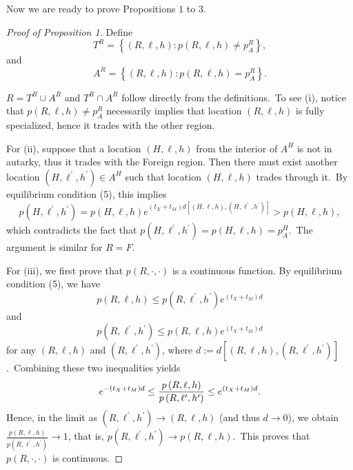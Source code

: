 \documentclass[12pt]{article}
\begin{document}
Now we are ready to prove Propositions $1$ to $3$.

\begin{proof}[Proof of Proposition 1]
Define%
\begin{equation*}
T^{R}=\left \{ \left( R,\ell ,h\right) :p\left( R,\ell ,h\right) \neq
p_{A}^{R}\right \} ,
\end{equation*}%
and%
\begin{equation*}
A^{R}=\left \{ \left( R,\ell ,h\right) :p\left( R,\ell ,h\right)
=p_{A}^{R}\right \} .
\end{equation*}

$R=T^{R}\cup A^{R}$ and $T^{R}\cap A^{R}$ follow directly from the
definitions.\ To see (i), notice that $p\left( R,\ell ,h\right) \neq
p_{A}^{R}$ necessarily implies that location $\left( R,\ell ,h\right) $ is
fully specialized, hence it trades with the other region.

For (ii), suppose that a location $\left( H,\ell ,h\right) $ from the
interior of $A^{H}$ is not in autarky, thus it trades with the Foreign
region. Then there must exist another location $\left( H,\ell ^{\prime
},h^{\prime }\right) \in A^{H}$ such that location $\left( H,\ell ,h\right) $
trades through it.\ By equilibrium condition (5), this implies%
\begin{equation*}
p\left( H,\ell ^{\prime },h^{\prime }\right) =p\left( H,\ell ,h\right)
e^{\left( t_{X}+t_{M}\right) d\left[ \left( H,\ell ,h\right) ,\left( H,\ell
^{\prime },h^{\prime }\right) \right] }>p\left( H,\ell ,h\right) ,
\end{equation*}%
which contradicts the fact that $p\left( H,\ell ^{\prime },h^{\prime
}\right) =p\left( H,\ell ,h\right) =p_{A}^{H}$.\ The argument is similar for 
$R=F$.

For (iii), we first prove that $p\left( R,\cdot ,\cdot \right) $ is a
continuous function. By equilibrium condition (5), we have%
\begin{equation*}
p\left( R,\ell ,h\right) \leq p\left( R,\ell ^{\prime },h^{\prime }\right)
e^{\left( t_{X}+t_{M}\right) d}
\end{equation*}%
and%
\begin{equation*}
p\left( R,\ell ^{\prime },h^{\prime }\right) \leq p\left( R,\ell ,h\right)
e^{\left( t_{X}+t_{M}\right) d}
\end{equation*}%
for any $\left( R,\ell ,h\right) $ and $\left( R,\ell ^{\prime },h^{\prime
}\right) $, where $d:=d\left[ \left( R,\ell ,h\right) ,\left( R,\ell
^{\prime },h^{\prime }\right) \right] $.\ Combining these two inequalities
yields%
\begin{equation*}
e^{-\left( t_{X}+t_{M}\right) d}\leq \frac{p\left( R,\ell ,h\right) }{%
p\left( R,\ell ^{\prime },h^{\prime }\right) }\leq e^{\left(
t_{X}+t_{M}\right) d}.
\end{equation*}%
Hence, in the limit as $\left( R,\ell ^{\prime },h^{\prime }\right)
\rightarrow \left( R,\ell ,h\right) $ (and thus $d\rightarrow 0$), we obtain 
$\frac{p\left( R,\ell ,h\right) }{p\left( R,\ell ^{\prime },h^{\prime
}\right) }\rightarrow 1$, that is, $p\left( R,\ell ^{\prime },h^{\prime
}\right) \rightarrow p\left( R,\ell ,h\right) $.\ This proves that $p\left(
R,\cdot ,\cdot \right) $ is continuous.


\end{proof}
\end{document}
